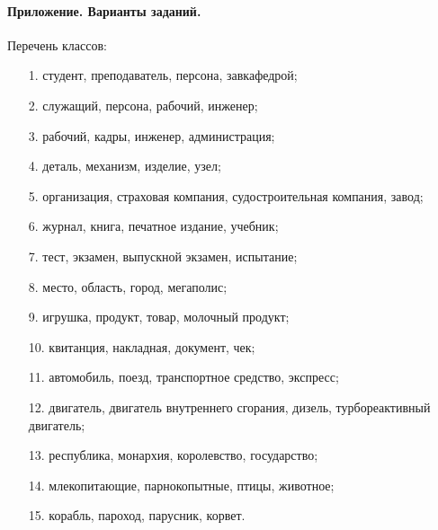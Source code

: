 \paragraph{Приложение. Варианты заданий.}

Перечень классов:

\begin{enumerate}
    \item[1.] студент, преподаватель, персона, завкафедрой;
    \item[2.] служащий, персона, рабочий, инженер;
    \item[3.] рабочий, кадры, инженер, администрация;
    \item[4.] деталь, механизм, изделие, узел;
    \item[5.] организация, страховая компания, судостроительная компания, завод;
    \item[6.] журнал, книга, печатное издание, учебник;
    \item[7.] тест, экзамен, выпускной экзамен, испытание;
    \item[8.] место, область, город, мегаполис;
    \item[9.] игрушка, продукт, товар, молочный продукт;
    \item[10.] квитанция, накладная, документ, чек;
    \item[11.] автомобиль, поезд, транспортное средство, экспресс;
    \item[12.] двигатель, двигатель внутреннего сгорания, дизель, турбореактивный двигатель;
    \item[13.] республика, монархия, королевство, государство;
    \item[14.] млекопитающие, парнокопытные, птицы, животное;
    \item[15.] корабль, пароход, парусник, корвет.
\end{enumerate}